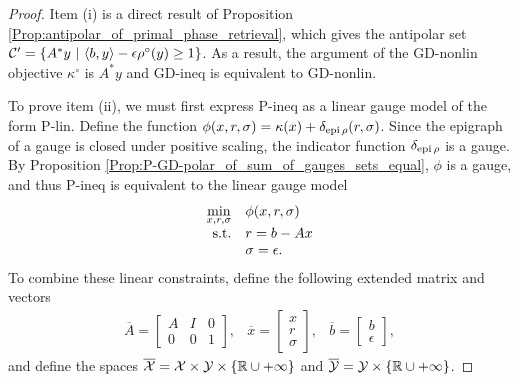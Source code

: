 \begin{proof}
Item (i) is a direct result of Proposition \ref{Prop:antipolar_of_primal_phase_retrieval}, which gives the antipolar set ${\mathcal C}' = \left\{ A^*y \ | \ \langle b, y \rangle - \epsilon \rho^\circ(y) \geq 1  \right\}$.  As a result, the argument of the GD-nonlin objective $\kappa^\circ$ is $A^*y$ and GD-ineq is equivalent to GD-nonlin.

To prove item (ii), we must first express P-ineq as a linear gauge model of the form P-lin.  Define the function $\phi(x, r, \sigma) = \kappa(x) + \delta_{\textnormal{epi} \hspace{0.05cm} \rho}(r, \sigma)$.  Since the epigraph of a gauge is closed under positive scaling, the indicator function $\delta_{\textnormal{epi} \hspace{0.05cm} \rho}$ is a gauge.  By Proposition \ref{Prop:P-GD-polar_of_sum_of_gauges_sets_equal}, $\phi$ is a gauge, and thus P-ineq is equivalent to the linear gauge model
\begin{equation}   			\label{Eqn:P-GD-Thm_duals-eqn1}
\begin{array}{rl}
\min\limits_{\substack{x, r, \sigma}} 
	&	\phi(x, r, \sigma)	\\
\textnormal{s.t.}
	&	r = b-Ax \\
	&	\sigma = \epsilon.
\end{array}
\end{equation}
To combine these linear constraints, define the following extended matrix and vectors
\begin{equation}
\begin{array}{lll}
\overline{A}
=	\begin{bmatrix}
		A	&	I	&	0	\\
		0	&	0	&	1
	\end{bmatrix},
	&	\overline{x} = \begin{bmatrix}
									x \\ r \\ \sigma
								\end{bmatrix},
	&	\overline{b}	=	\begin{bmatrix}
									b	\\	 \epsilon
								\end{bmatrix},
\end{array}	
\end{equation}
and define the spaces $\overline{{\mathcal X}} = {\mathcal X} \times {\mathcal Y} \times \{{\mathbb R} \cup +\infty\}$ and $\overline{{\mathcal Y}} = {\mathcal Y} \times \{{\mathbb R} \cup +\infty\}$.


\end{proof}
